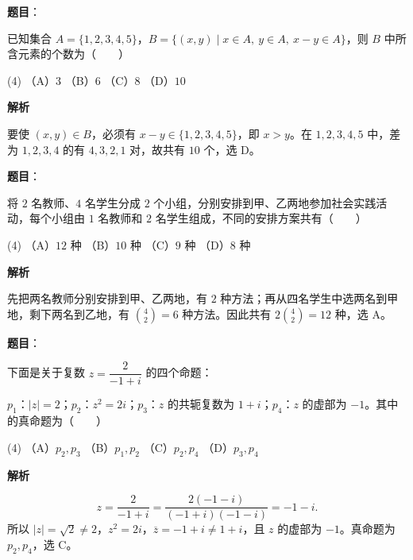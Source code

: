 

\begin{answer}

\textbf{题目}：

已知集合 $A=\{1,2,3,4,5\}$，$B=\{(x,y)\mid x\in A,\ y\in A,\ x-y\in A\}$，则 $B$ 中所含元素的个数为\mbox{（　　）}

\begin{gkopts}(4)
\task （A）$3$
\task （B）$6$
\task （C）$8$
\task （D）$10$
\end{gkopts}

\textbf{解析}

要使 $(x,y)\in B$，必须有 $x-y\in\{1,2,3,4,5\}$，即 $x>y$。在 $1,2,3,4,5$ 中，差为 $1,2,3,4$ 的有 $4,3,2,1$ 对，故共有 $10$ 个，选 D。


\end{answer}
\begin{answer}

\textbf{题目}：

将 $2$ 名教师、$4$ 名学生分成 $2$ 个小组，分别安排到甲、乙两地参加社会实践活动，每个小组由 $1$ 名教师和 $2$ 名学生组成，不同的安排方案共有\mbox{（　　）}

\begin{gkopts}(4)
\task （A）$12$ 种
\task （B）$10$ 种
\task （C）$9$ 种
\task （D）$8$ 种
\end{gkopts}

\textbf{解析}

先把两名教师分别安排到甲、乙两地，有 $2$ 种方法；再从四名学生中选两名到甲地，剩下两名到乙地，有 $\binom42=6$ 种方法。因此共有 $2\binom42=12$ 种，选 A。


\end{answer}
\begin{answer}

\textbf{题目}：

下面是关于复数 $z=\dfrac{2}{-1+i}$ 的四个命题：

$p_1$：$|z|=2$；$p_2$：$z^2=2i$；$p_3$：$z$ 的共轭复数为 $1+i$；$p_4$：$z$ 的虚部为 $-1$。其中的真命题为\mbox{（　　）}

\begin{gkopts}(4)
\task （A）$p_2,p_3$
\task （B）$p_1,p_2$
\task （C）$p_2,p_4$
\task （D）$p_3,p_4$
\end{gkopts}

\textbf{解析}

\nopagebreak[4]
\[
z=\frac{2}{-1+i}=\frac{2(-1-i)}{(-1+i)(-1-i)}=-1-i.
\]
所以 $|z|=\sqrt2\ne2$，$z^2=2i$，$\overline z=-1+i\ne1+i$，且 $z$ 的虚部为 $-1$。真命题为 $p_2,p_4$，选 C。


\end{answer}
